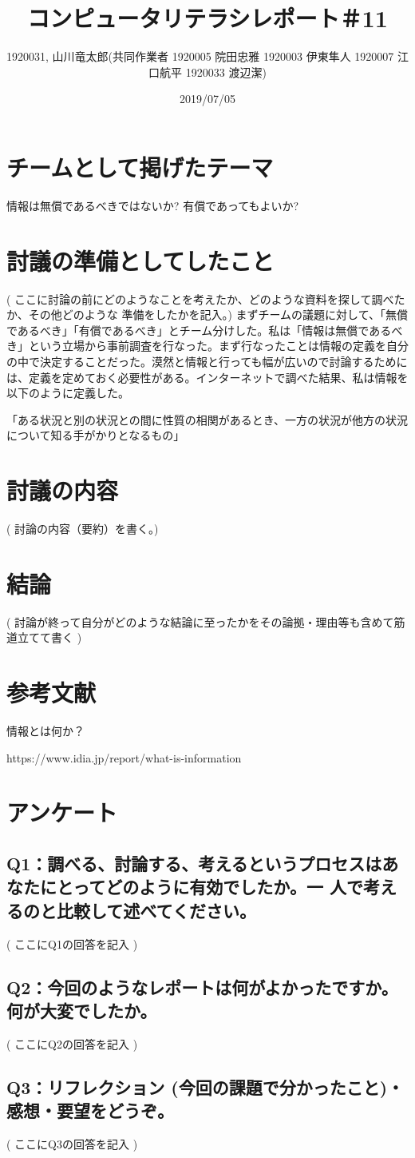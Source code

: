 \documentclass[12pt,a4j]{jarticle}
\begin{document}
\title{コンピュータリテラシレポート＃11}
\author{1920031, 山川竜太郎(共同作業者 1920005 院田忠雅 1920003 伊東隼人 1920007 江口航平 1920033 渡辺潔)}
\date{2019/07/05}
\maketitle

\section{チームとして掲げたテーマ}
情報は無償であるべきではないか? 有償であってもよいか?

\section{討議の準備としてしたこと}
( ここに討論の前にどのようなことを考えたか、どのような資料を探して調べたか、その他どのような 準備をしたかを記入。)
まずチームの議題に対して、「無償であるべき」「有償であるべき」とチーム分けした。私は「情報は無償であるべき」という立場から事前調査を行なった。まず行なったことは情報の定義を自分の中で決定することだった。漠然と情報と行っても幅が広いので討論するためには、定義を定めておく必要性がある。インターネットで調べた結果、私は情報を以下のように定義した。

「ある状況と別の状況との間に性質の相関があるとき、一方の状況が他方の状況について知る手がかりとなるもの」



\section{討議の内容}
( 討論の内容（要約）を書く。)

\section{結論}
( 討論が終って自分がどのような結論に至ったかをその論拠・理由等も含めて筋道立てて書く )

\section{参考文献}

情報とは何か？

https://www.idia.jp/report/what-is-information

\section{アンケート}

\subsection{Q1：調べる、討論する、考えるというプロセスはあなたにとってどのように有効でしたか。一 人で考えるのと比較して述べてください。}
( ここにQ1の回答を記入 )

\subsection{Q2：今回のようなレポートは何がよかったですか。何が大変でしたか。}
( ここにQ2の回答を記入 )

\subsection{Q3：リフレクション (今回の課題で分かったこと)・感想・要望をどうぞ。}
( ここにQ3の回答を記入 )
\end{document}
